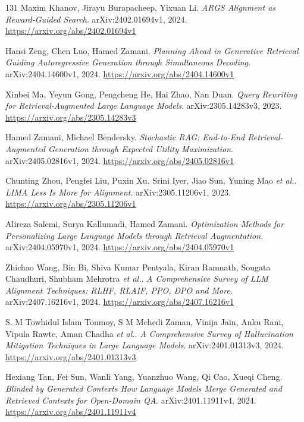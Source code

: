\documentclass[11pt,a4paper]{article}
\begin{document}
\begin{thebibliography}{131}
Maxim Khanov, Jirayu Burapacheep, Yixuan Li.
\newblock \emph{ARGS Alignment as Reward-Guided Search}.
\newblock arXiv:2402.01694v1, 2024.
\newblock \url{https://arxiv.org/abs/2402.01694v1}

Hansi Zeng, Chen Luo, Hamed Zamani.
\newblock \emph{Planning Ahead in Generative Retrieval Guiding Autoregressive Generation through Simultaneous Decoding}.
\newblock arXiv:2404.14600v1, 2024.
\newblock \url{https://arxiv.org/abs/2404.14600v1}

Xinbei Ma, Yeyun Gong, Pengcheng He, Hai Zhao, Nan Duan.
\newblock \emph{Query Rewriting for Retrieval-Augmented Large Language Models}.
\newblock arXiv:2305.14283v3, 2023.
\newblock \url{https://arxiv.org/abs/2305.14283v3}

Hamed Zamani, Michael Bendersky.
\newblock \emph{Stochastic RAG: End-to-End Retrieval-Augmented Generation through Expected Utility Maximization}.
\newblock arXiv:2405.02816v1, 2024.
\newblock \url{https://arxiv.org/abs/2405.02816v1}

Chunting Zhou, Pengfei Liu, Puxin Xu, Srini Iyer, Jiao Sun, Yuning Mao \emph{et al.}.
\newblock \emph{LIMA Less Is More for Alignment}.
\newblock arXiv:2305.11206v1, 2023.
\newblock \url{https://arxiv.org/abs/2305.11206v1}

Alireza Salemi, Surya Kallumadi, Hamed Zamani.
\newblock \emph{Optimization Methods for Personalizing Large Language Models through Retrieval Augmentation}.
\newblock arXiv:2404.05970v1, 2024.
\newblock \url{https://arxiv.org/abs/2404.05970v1}

Zhichao Wang, Bin Bi, Shiva Kumar Pentyala, Kiran Ramnath, Sougata Chaudhuri, Shubham Mehrotra \emph{et al.}.
\newblock \emph{A Comprehensive Survey of LLM Alignment Techniques: RLHF, RLAIF, PPO, DPO and More}.
\newblock arXiv:2407.16216v1, 2024.
\newblock \url{https://arxiv.org/abs/2407.16216v1}

S. M Towhidul Islam Tonmoy, S M Mehedi Zaman, Vinija Jain, Anku Rani, Vipula Rawte, Aman Chadha \emph{et al.}.
\newblock \emph{A Comprehensive Survey of Hallucination Mitigation Techniques in Large Language Models}.
\newblock arXiv:2401.01313v3, 2024.
\newblock \url{https://arxiv.org/abs/2401.01313v3}

Hexiang Tan, Fei Sun, Wanli Yang, Yuanzhuo Wang, Qi Cao, Xueqi Cheng.
\newblock \emph{Blinded by Generated Contexts How Language Models Merge Generated and Retrieved Contexts for Open-Domain QA}.
\newblock arXiv:2401.11911v4, 2024.
\newblock \url{https://arxiv.org/abs/2401.11911v4}


\end{thebibliography}
\end{document}
